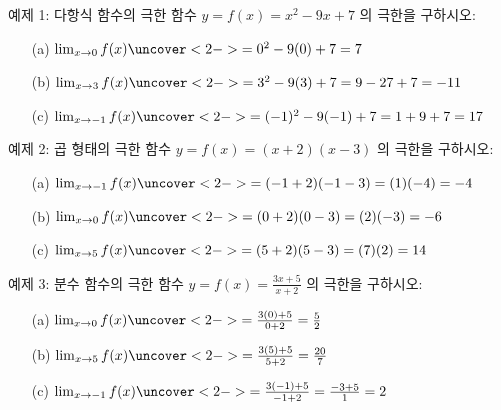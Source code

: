 \documentclass[aspectratio=169]{beamer}
\begin{document}
\begin{frame}{예제 1: 다항식 함수의 극한}
  함수 \( y = f(x) = x^2 - 9x + 7 \) 의 극한을 구하시오:
  \begin{itemize}
    \item[(a)] \( \lim_{x \to 0} f(x) \uncover<2->{ = 0^2 - 9(0) + 7 = 7} \)
    \vspace{0.3cm}
    \item[(b)] \( \lim_{x \to 3} f(x) \uncover<2->{ = 3^2 - 9(3) + 7 = 9 - 27 + 7 = -11} \)
    \vspace{0.3cm}
    \item[(c)] \( \lim_{x \to -1} f(x) \uncover<2->{ = (-1)^2 - 9(-1) + 7 = 1 + 9 + 7 = 17} \)
  \end{itemize}
\end{frame}

\begin{frame}{예제 2: 곱 형태의 극한}
함수 \( y = f(x) = (x + 2)(x - 3) \) 의 극한을 구하시오:
\begin{itemize}
  \item[(a)] \( \lim_{x \to -1} f(x) \uncover<2->{ = (-1 + 2)(-1 - 3) = (1)(-4) = -4} \)
  \vspace{0.3cm}
  \item[(b)] \( \lim_{x \to 0} f(x) \uncover<2->{ = (0 + 2)(0 - 3) = (2)(-3) = -6} \)
  \vspace{0.3cm}
  \item[(c)] \( \lim_{x \to 5} f(x) \uncover<2->{ = (5 + 2)(5 - 3) = (7)(2) = 14} \)
\end{itemize}
\end{frame}

\begin{frame}{예제 3: 분수 함수의 극한}
함수 \( y = f(x) = \frac{3x + 5}{x + 2} \) 의 극한을 구하시오:
\begin{itemize}
  \item[(a)] \( \lim_{x \to 0} f(x) \uncover<2->{ = \frac{3(0) + 5}{0 + 2} = \frac{5}{2}} \)
  \vspace{0.3cm}
  \item[(b)] \( \lim_{x \to 5} f(x) \uncover<2->{ = \frac{3(5) + 5}{5 + 2} = \frac{20}{7}} \)
  \vspace{0.3cm}
  \item[(c)] \( \lim_{x \to -1} f(x) \uncover<2->{ = \frac{3(-1) + 5}{-1 + 2} = \frac{-3 + 5}{1} = 2} \)
\end{itemize}
\end{frame}
\end{document}
